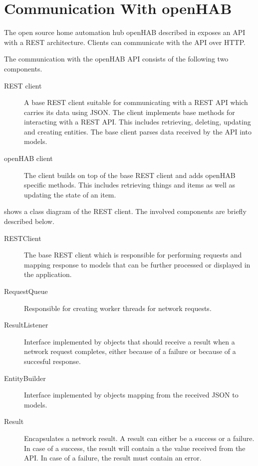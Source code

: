 \chapter{Communication With openHAB}
\label{appendix:communication-with-openhab}

The open source home automation hub openHAB described in  exposes an API with a REST architecture. Clients can communicate with the API over HTTP.

The communication with the openHAB API consists of the following two components.

\begin{description}
\item[REST client] A base REST client suitable for communicating with a REST API which carries its data using JSON. The client implements base methods for interacting with a REST API. This includes retrieving, deleting, updating and creating entities. The base client parses data received by the API into models.
\item[openHAB client] The client builds on top of the base REST client and adds openHAB specific methods. This includes retrieving things and items as well as updating the state of an item.
\end{description}

 shows a class diagram of the REST client. The involved components are briefly described below.

\begin{description}
\item[RESTClient] The base REST client which is responsible for performing requests and mapping response to models that can be further processed or displayed in the application.
\item[RequestQueue] Responsible for creating worker threads for network requests.
\item[ResultListener] Interface implemented by objects that should receive a result when a network request completes, either because of a failure or because of a succesful response.
\item[EntityBuilder] Interface implemented by objects mapping from the received JSON to models.
\item[Result] Encapsulates a network result. A result can either be a success or a failure. In case of a success, the result will contain a the value received from the API. In case of a failure, the result must contain an error.
\end{description}

